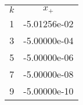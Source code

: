 \begin{tabular}{cc}
\hline
 $k$ & $x_+$ \\
1 &-5.01256e-02\\
3 &-5.00000e-04\\
5 &-5.00000e-06\\
7 &-5.00000e-08\\
9 &-5.00000e-10\\
\hline
\end{tabular}
